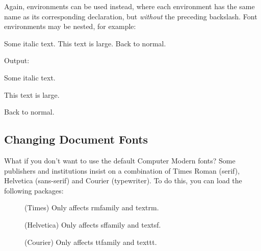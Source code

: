 Again, \glspl{environment} can be used instead, where
each \gls{environment} has the same name as its corresponding
declaration, but \emph{without} the preceding backslash.
Font environments may be nested, for example:%
\begin{code}
 Some italic text.
This text is large.
 Back to normal.
\end{code}%
Output:
\begin{resultS}
\begin{itshape} Some italic text.
\begin{Large}This text is large.\end{Large}
\end{itshape}
Back to normal.
\end{resultS}

\subsection{Changing Document Fonts}
\label{sec:changingfonts}

What if you don't
want to use the default Computer Modern fonts? Some publishers and
institutions insist on a combination of Times Roman (serif),
Helvetica (sans-serif) and Courier (typewriter). To do this, you can
load the following packages:
\begin{description}
\item[] (Times) Only affects \gls{rmfamily} and
\gls{textrm}.

\item[] (Helvetica) Only affects \gls{sffamily} and
\gls{textsf}.

\item[] (Courier) Only affects \gls{ttfamily}
and \gls{texttt}.
\end{description}


